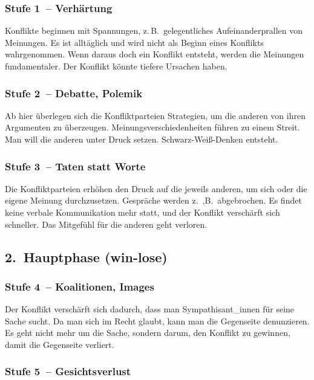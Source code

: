 \subsubsection{Stufe 1~-- Verhärtung}

Konflikte beginnen mit Spannungen, z.\,B.~gelegentliches Aufeinanderprallen von Meinungen. Es ist alltäglich und wird nicht als Beginn eines Konflikts wahrgenommen. Wenn daraus doch ein Konflikt entsteht, werden die Meinungen fundamentaler. Der Konflikt könnte tiefere Ursachen haben.

\subsubsection{Stufe 2~-- Debatte, Polemik}

Ab hier überlegen sich die Konfliktparteien Strategien, um die anderen von ihren Argumenten zu überzeugen. Meinungsverschiedenheiten führen zu einem Streit. Man will die anderen unter Druck setzen. Schwarz-Weiß-Denken entsteht.

\subsubsection{Stufe 3~-- Taten statt Worte}

Die Konfliktparteien erhöhen den Druck auf die jeweils anderen, um sich oder die eigene Meinung durchzusetzen. Gespräche werden z.~,B.~abgebrochen. Es findet keine verbale Kommunikation mehr statt, und der Konflikt verschärft sich schneller. Das Mitgefühl für die \glqq anderen\grqq{} geht verloren.


\subsection{2.~Hauptphase (win-lose)}

\subsubsection{Stufe 4~-- Koalitionen, Images}

Der Konflikt verschärft sich dadurch, dass man Sympathisant\_innen für seine Sache sucht. Da man sich im Recht glaubt, kann man die Gegenseite denunzieren. Es geht nicht mehr um die Sache, sondern darum, den Konflikt zu gewinnen, damit die Gegenseite verliert.

\subsubsection{Stufe 5~-- Gesichtsverlust}


